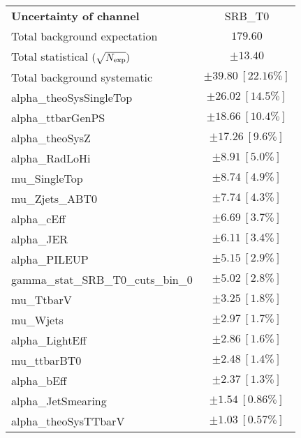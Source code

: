 
\begin{table}
\begin{center}
\setlength{\tabcolsep}{0.0pc}
\begin{tabular*}{\textwidth}{@{\extracolsep{\fill}}lc}
\noalign{\smallskip}\hline\noalign{\smallskip}
{\bf Uncertainty of channel}                                    & SRB\_T0            \\
\noalign{\smallskip}\hline\noalign{\smallskip}
Total background expectation             &  $179.60$       \\
\noalign{\smallskip}\hline\noalign{\smallskip}
Total statistical $(\sqrt{N_{\rm exp}})$              & $\pm 13.40$       \\
Total background systematic               & $\pm 39.80\ [22.16\%] $             \\
\noalign{\smallskip}\hline\noalign{\smallskip}
\noalign{\smallskip}\hline\noalign{\smallskip}
alpha\_theoSysSingleTop         & $\pm 26.02\ [14.5\%] $       \\
alpha\_ttbarGenPS         & $\pm 18.66\ [10.4\%] $       \\
alpha\_theoSysZ         & $\pm 17.26\ [9.6\%] $       \\
alpha\_RadLoHi         & $\pm 8.91\ [5.0\%] $       \\
mu\_SingleTop         & $\pm 8.74\ [4.9\%] $       \\
mu\_Zjets\_ABT0         & $\pm 7.74\ [4.3\%] $       \\
alpha\_cEff         & $\pm 6.69\ [3.7\%] $       \\
alpha\_JER         & $\pm 6.11\ [3.4\%] $       \\
alpha\_PILEUP         & $\pm 5.15\ [2.9\%] $       \\
gamma\_stat\_SRB\_T0\_cuts\_bin\_0         & $\pm 5.02\ [2.8\%] $       \\
mu\_TtbarV         & $\pm 3.25\ [1.8\%] $       \\
mu\_Wjets         & $\pm 2.97\ [1.7\%] $       \\
alpha\_LightEff         & $\pm 2.86\ [1.6\%] $       \\
mu\_ttbarBT0         & $\pm 2.48\ [1.4\%] $       \\
alpha\_bEff         & $\pm 2.37\ [1.3\%] $       \\
alpha\_JetSmearing         & $\pm 1.54\ [0.86\%] $       \\
alpha\_theoSysTTbarV         & $\pm 1.03\ [0.57\%] $       \\

\end{tabular*}
\end{center}
\end{table}
